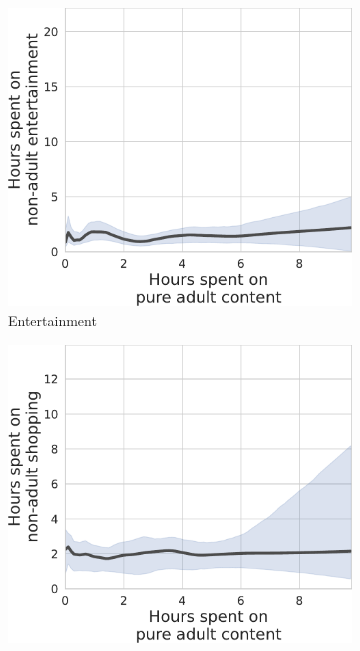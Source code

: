 \documentclass[12pt, letterpaper]{article}
\begin{document}
\begin{figure}[ht]
\caption{Time Spent on Online Pure Pornography vs. Non-adult Leisure}
\label{fig:tu_prop_entertainment-prop_pure_adult}
     \centering
     \begin{subfigure}[b]{0.495\textwidth}
         \centering
         \includegraphics[width=\textwidth]{figs/tu_duration_entertainment-duration_pure_adult.pdf}
         \caption{Entertainment}
     \end{subfigure}
     \hfill
     \begin{subfigure}[b]{0.495\textwidth}
         \centering
         \includegraphics[width=\textwidth]{figs/tu_duration_shop-duration_pure_adult.pdf}

\end{subfigure}
\end{figure}
\end{document}

